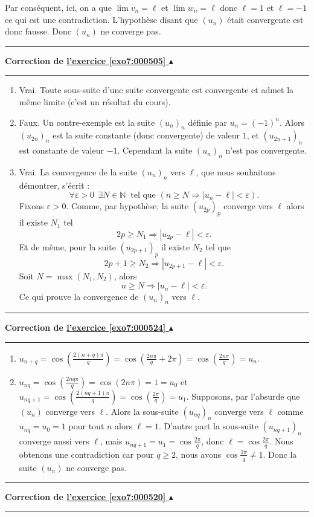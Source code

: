 \documentclass[11pt,a4paper]{article}
\newcommand{\Nn}{\mathbb{N}} \newcommand{\N}{\mathbb{N}}
\renewcommand{\epsilon}{\varepsilon}
\newcounter{exo}
\newcommand{\correction}[1]{\hypertarget{cor7:#1}{}\label{cor7:#1}{\bf Correction de \hyperlink{exo7:#1}{l'exercice \ref{exo7:#1} $\blacktriangle$}}\vspace{1mm}\hrule\vspace{1mm}}
\newcommand{\fincorrection}{\vspace{1mm}\hrule\vspace*{7mm}}
\begin{document}
Par cons\'equent, ici, on a que $\lim v_n=\ell$ et $\lim w_n=\ell$  donc
$\ell=1$ et $\ell=-1$ ce qui est une contradiction. L'hypoth\`ese disant
que $(u_n)$ \'etait convergente est donc fausse. Donc $(u_n)$ ne
converge pas.
\fincorrection
\correction{000505}
\begin{enumerate}
  \item Vrai. Toute sous-suite d'une suite convergente est convergente
et admet la m\^eme limite (c'est un résultat du cours).
  \item Faux. Un contre-exemple est la suite $(u_n)_n$ d\'efinie
par $u_n = (-1)^n$. Alors $(u_{2n})_n$ est la suite constante
(donc convergente) de valeur $1$, et $(u_{2n+1})_n$ est constante
de valeur $-1$. Cependant la suite $(u_n)_n$ n'est pas
convergente.
  \item Vrai.
La convergence de la suite $(u_n)_n$ vers $\ell$, que nous
souhaitons d\'emontrer, s'\'ecrit :
$$ \forall \epsilon > 0\  \ \exists N \in \Nn \ \text{\  tel que\ \  }
(n \geqslant N \Rightarrow |u_n-\ell| < \epsilon).$$ 
Fixons $\epsilon >
0$. Comme, par hypoth\`ese, la suite $(u_{2p})_p$  converge vers
$\ell$ alors il existe $N_1$ tel
$$ 2p \geqslant N_1 \Rightarrow |u_{2p}-\ell| < \epsilon.$$
Et de m\^eme, pour la suite $(u_{2p+1})_p$ il existe $N_2$ tel que
$$ 2p+1 \geqslant N_2 \Rightarrow |u_{2p+1}-\ell| < \epsilon.$$
Soit $N = \max(N_1,N_2)$, alors
$$n \geqslant N\Rightarrow |u_{n}-\ell| < \epsilon.$$
Ce qui prouve la convergence de $(u_n)_n$ vers $\ell$.
\end{enumerate}
\fincorrection
\correction{000524}
\begin{enumerate}
  \item $u_{n+q} = \cos \left( \frac{2(n+q)\pi}{q} \right) = \cos \left(\frac{2n\pi}{q}+2\pi\right) = \cos \left(\frac{2n\pi}{q}\right) = u_n$.
  \item $u_{nq} = \cos \left(\frac{2nq\pi}{q}\right) = \cos \left({2n\pi}\right)= 1 = u_0$ et $u_{nq+1} = \cos \left(\frac{2(nq+1)\pi}{q}\right) = \cos \left(\frac{2\pi}{q}\right) = u_1$.
Supposons, par l'absurde que $(u_n)$ converge vers $\ell$.
Alors la sous-suite $(u_{nq})_n$ converge vers $\ell$ comme 
$u_{nq}= u_0 = 1$ pour tout $n$ alors $\ell = 1$. D'autre part
la sous-suite $(u_{nq+1})_n$ converge aussi vers $\ell$, mais 
$u_{nq+1}= u_1 = \cos \frac{2\pi}{q}$, donc $\ell = \cos \frac{2\pi}{q}$. Nous obtenons une contradiction car pour $q\geq 2$, nous avons $\cos \frac{2\pi}{q} \not= 1$. Donc la suite $(u_n)$ ne converge pas.
\end{enumerate}
\fincorrection
\correction{000520}
\end{document}
